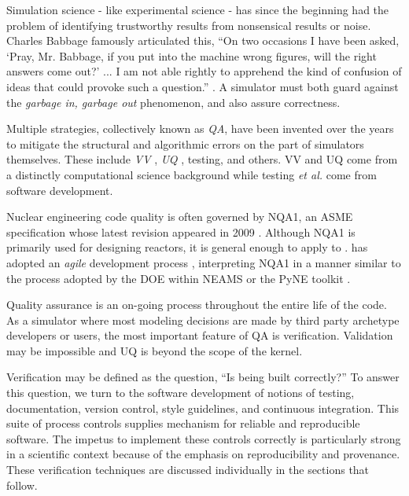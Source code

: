 
Simulation science - like experimental science - has since the beginning had the 
problem of identifying trustworthy results from nonsensical results or noise.
Charles Babbage famously articulated this, ``On two occasions I have been asked, 
`Pray, Mr. Babbage, if you put into the machine wrong figures, will the right 
answers come out?' ... I am not able rightly to apprehend the kind of confusion 
of ideas that could provoke such a question.'' \cite{babbage_passages_2011}. 
A simulator must both guard against the \emph{garbage in, garbage out} phenomenon, and also assure correctness.

Multiple strategies, collectively known as \emph{\gls{QA}}, have 
been invented over the years to mitigate the structural and algorithmic errors
on the part of simulators themselves. These include \emph{\gls{VV}}
\cite{boehm_software_1989}, \emph{\gls{UQ}} 
\cite{sacks_design_1989}, testing, and others. \gls{VV} and \gls{UQ} come from 
a distinctly computational science background while testing \emph{et al.} come from software development. 

Nuclear engineering code quality is often governed by \gls{NQA1}, an 
\gls{ASME} specification 
whose latest revision appeared in 2009 \cite{asme_nqa-1a-2009_2009}.  
Although \gls{NQA1} is primarily 
used for designing reactors, it is general enough to apply to 
\Cyclus. \Cyclus has adopted an \emph{agile} development process 
\cite{larman_agile_2004}, 
interpreting \gls{NQA1} in a manner similar to the process adopted by the 
\gls{DOE} within \gls{NEAMS} \cite{neams_nuclear_2013} or the 
PyNE toolkit \cite{biondo_quality_2014}. 

Quality assurance is an on-going process throughout the 
entire life of the code. As a simulator where most modeling decisions are made 
by third party archetype developers or users, the most important feature of 
\gls{QA} is verification. Validation may be impossible and \gls{UQ} is beyond 
the scope of the kernel.

Verification may be defined as the question, ``Is \Cyclus being built correctly?'' 
To answer this question, we turn to the software development of notions of testing,
documentation, version control, style guidelines, and continuous integration. 
This suite of process controls supplies mechanism for reliable and reproducible 
software. The impetus to implement these controls correctly is particularly strong in a scientific 
context because of the emphasis on reproducibility and provenance. These verification techniques are 
discussed individually in the sections that follow.

